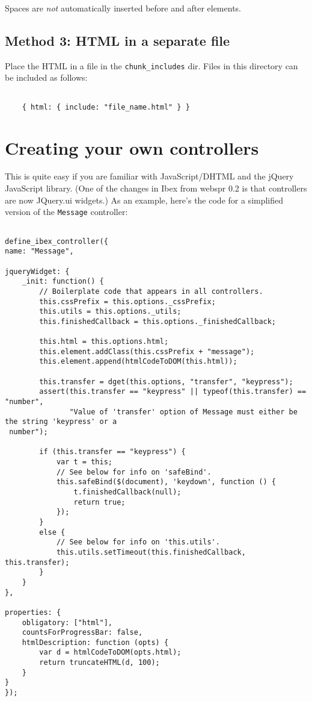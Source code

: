 \documentclass[11pt,letterpaper]{article}
\begin{document}
\smallskip\noindent\normalsize

Spaces are\textit{ not}  automatically inserted before and after elements.

\subsection{Method 3: HTML in a separate file}

Place the HTML in a file in the \texttt{chunk\_includes} dir.
Files in this directory can be included as follows:
\footnotesize\begin{verbatim}

    { html: { include: "file_name.html" } }
\end{verbatim}

\smallskip\noindent\normalsize


\section{Creating your own controllers}

This is quite easy if you are familiar with JavaScript/DHTML
and the jQuery JavaScript library. (One of the changes in Ibex
from webspr 0.2 is that controllers are now JQuery.ui widgets.)
As an example, here's the code for a simplified version of the
\texttt{Message} controller:
\footnotesize\begin{verbatim}

define_ibex_controller({
name: "Message",

jqueryWidget: {
    _init: function() {
        // Boilerplate code that appears in all controllers.
        this.cssPrefix = this.options._cssPrefix;
        this.utils = this.options._utils;
        this.finishedCallback = this.options._finishedCallback;

        this.html = this.options.html;
        this.element.addClass(this.cssPrefix + "message");
        this.element.append(htmlCodeToDOM(this.html));

        this.transfer = dget(this.options, "transfer", "keypress");
        assert(this.transfer == "keypress" || typeof(this.transfer) == "number",
               "Value of 'transfer' option of Message must either be the string 'keypress' or a
 number");

        if (this.transfer == "keypress") {
            var t = this;
            // See below for info on 'safeBind'.
            this.safeBind($(document), 'keydown', function () {
                t.finishedCallback(null);
                return true;
            });
        }
        else {
            // See below for info on 'this.utils'.
            this.utils.setTimeout(this.finishedCallback, this.transfer);
        }
    }
},

properties: {
    obligatory: ["html"],
    countsForProgressBar: false,
    htmlDescription: function (opts) {
        var d = htmlCodeToDOM(opts.html);
        return truncateHTML(d, 100);
    }
}
});
\end{verbatim}
\end{document}
